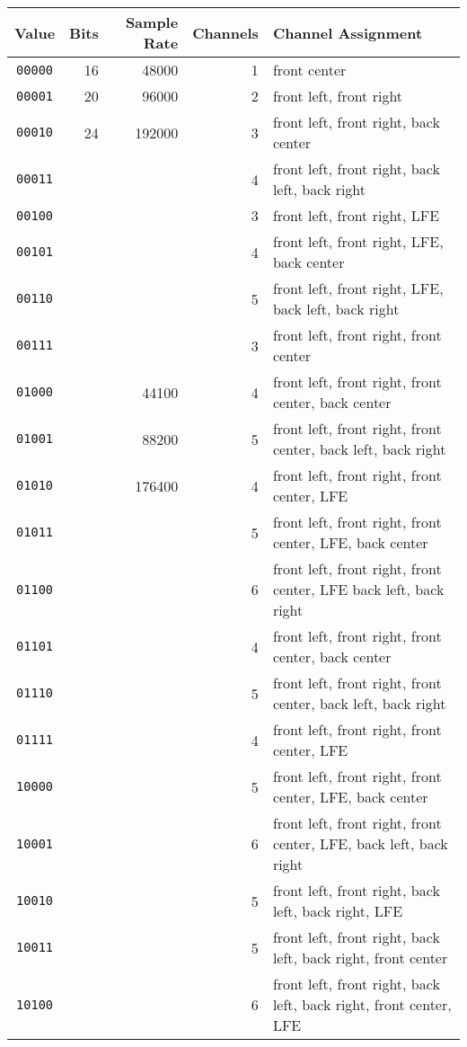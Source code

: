 \begin{tiny}
\begin{tabular}{|c|r|r|r|l|}
\hline
Value & Bits & Sample Rate & Channels & Channel Assignment \\
\hline
\texttt{00000} & 16 & 48000 & 1 & front center \\
\texttt{00001} & 20 & 96000 & 2 & front left, front right\\
\texttt{00010} & 24 & 192000 & 3 & front left, front right, back center \\
\texttt{00011} & & & 4 & front left, front right, back left, back right\\
\texttt{00100} & & & 3 & front left, front right, LFE \\
\texttt{00101} & & & 4 & front left, front right, LFE, back center \\
\texttt{00110} & & & 5 & front left, front right, LFE, back left, back right \\
\texttt{00111} & & & 3 & front left, front right, front center \\
\texttt{01000} & & 44100 & 4 & front left, front right, front center, back center \\
\texttt{01001} & & 88200 & 5 & front left, front right, front center, back left, back right \\
\texttt{01010} & & 176400 & 4 & front left, front right, front center, LFE\\
\texttt{01011} & & & 5 & front left, front right, front center, LFE, back center \\
\texttt{01100} & & & 6 & front left, front right, front center, LFE back left, back right \\
\texttt{01101} & & & 4 & front left, front right, front center, back center \\
\texttt{01110} & & & 5 & front left, front right, front center, back left, back right \\
\texttt{01111} & & & 4 & front left, front right, front center, LFE \\
\texttt{10000} & & & 5 & front left, front right, front center, LFE, back center \\
\texttt{10001} & & & 6 & front left, front right, front center, LFE, back left, back right \\
\texttt{10010} & & & 5 & front left, front right, back left, back right, LFE \\
\texttt{10011} & & & 5 & front left, front right, back left, back right, front center \\
\texttt{10100} & & & 6 & front left, front right, back left, back right, front center, LFE \\
\hline
\end{tabular}
\end{tiny}

